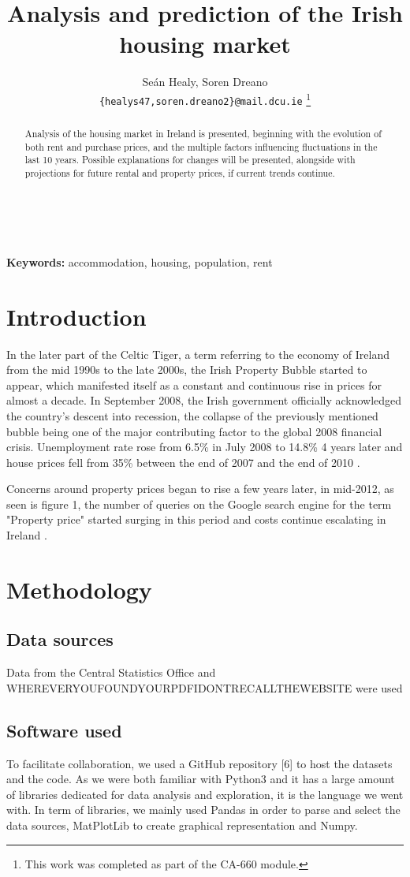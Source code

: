 \documentclass[twocolumn]{article}
\title{Analysis and prediction of the Irish housing market}
\author{
    Seán Healy, Soren Dreano\\
    \texttt{\{healys47,soren.dreano2\}@mail.dcu.ie}
    \footnote{This work was completed as part of the CA-660 module.}
}
\begin{document}
\maketitle
\begin{abstract}
Analysis of the housing market in Ireland is presented, beginning with the
evolution of both rent and purchase prices, and the multiple factors
influencing fluctuations in the last 10 years. Possible explanations for
changes will be presented, alongside with projections for future rental and
property prices, if current trends continue.
\end{abstract}\\\\
{\bf Keywords:} accommodation, housing, population, rent

\section{Introduction\label{s:intro}}

In the later part of the Celtic Tiger, a term referring to the economy of Ireland from the mid 1990s to the late 2000s, the Irish Property Bubble started to appear, which manifested itself as a constant and continuous rise in prices for almost a decade. In September 2008, the Irish government officially acknowledged the country's descent into recession\cite{kollewe08}, the collapse of the previously mentioned bubble being one of the major contributing factor to the global 2008 financial crisis. Unemployment rate rose from 6.5\% in July 2008 to 14.8\% 4 years later \cite{cso14} and house prices fell from 35\% between the end of 2007 and the end of 2010 \cite{environ10}.

Concerns around property prices began to rise a few years later, in mid-2012, as seen is figure 1, the number of queries on the Google search engine for the term "Property price" started surging in this period and costs continue escalating in Ireland \cite{kennedy21}.

\section{Methodology}
\subsection{Data sources}
Data from the Central Statistics Office and
WHEREVERYOUFOUNDYOURPDFIDONTRECALLTHEWEBSITE were used

\subsection{Software used}
To facilitate collaboration, we used a GitHub repository [6] to host the datasets and the code. As we were both familiar with Python3 and it has a large amount of libraries dedicated for data analysis and exploration, it is the language we went with. In term of libraries, we mainly used Pandas in order to parse and select the data sources, MatPlotLib to create graphical representation and Numpy.
\end{document}
